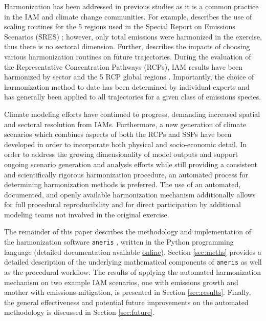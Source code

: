 \documentclass[review]{elsarticle}
\newcommand{\code}[1]{\lstinline[basicstyle=\ttfamily\color{black}]|#1|}
\begin{document}
Harmonization has been addressed in previous studies as it is a common practice
in the IAM and climate change communities. For example,
\cite{meinshausen_rcp_2011} describes the use of scaling routines for the 5
regions used in the Special Report on Emissions Scenarios (SRES)
\cite{nakicenovic2000}; however, only total emissions were harmonized in the
exercise, thus there is no sectoral dimension. Further,
\cite{rogelj_discrepancies_2011} describes the impacts of choosing various
harmonization routines on future trajectories. During the evaluation of the
Representative Concentration Pathways (RCPs), IAM results have been harmonized
by sector and the 5 RCP global regions
\cite{vuuren_representative_2011}. Importantly, the choice of harmonization
method to date has been determined by individual experts and has generally been
applied to all trajectories for a given class of emissions species.

Climate modeling efforts have continued to progress, demanding increased spatial
and sectoral resolution from IAMs. Furthermore, a new generation of climate
scenarios which combines aspects of both the RCPs and SSPs have been developed
in order to incorporate both physical and socio-economic detail. In order to
address the growing dimensionality of model outputs and support ongoing scenario
generation and analysis efforts while still providing a consistent and
scientifically rigorous harmonization procedure, an automated process for
determining harmonization methods is preferred. The use of an automated,
documented, and openly available harmonization mechanism additionally allows for
full procedural reproducibility and for direct participation by additional
modeling teams not involved in the original exercise.

The remainder of this paper describes the methodology and implementation of the
harmonization software \code{aneris} \cite{matthew_gidden_2017_802832}, written
in the Python programming language (detailed documentation available
\href{http://mattgidden.com/aneris/}{online}). Section \ref{sec:meths} provides
a detailed description of the underlying mathematical components of
\code{aneris} as well as the procedural workflow. The results of applying the
automated harmonization mechanism on two example IAM scenarios, one with
emissions growth and another with emissions mitigation, is presented in Section
\ref{sec:results}. Finally, the general effectiveness and potential future
improvements on the automated methodology is discussed in Section
\ref{sec:future}.
\end{document}
